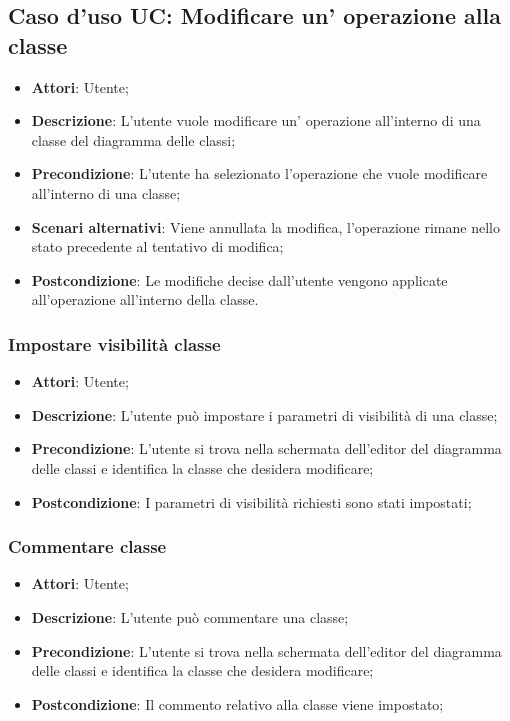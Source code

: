 \documentclass[../AnalisiDeiRequisiti.tex]{subfiles}
\begin{document}
	\subsection{Caso d'uso UC: Modificare un' operazione alla classe}
	\begin{itemize}
		\item \textbf{Attori}: Utente;
		
		\item \textbf{Descrizione}: L'utente vuole modificare un' operazione all'interno di una classe del diagramma delle classi;
		
		\item \textbf{Precondizione}: L'utente ha selezionato l'operazione che vuole modificare all'interno di una classe;
		
		\item \textbf{Scenari alternativi}: Viene annullata la modifica, l'operazione 
		rimane nello stato precedente al tentativo di modifica;
		
		\item \textbf{Postcondizione}: Le modifiche decise dall'utente vengono applicate all'operazione all'interno della classe.
	\end{itemize}
	
	
	\subsubsection{Impostare visibilità classe}
	\begin{itemize}
		\item \textbf{Attori}: Utente;
		\item \textbf{Descrizione}: L'utente può impostare i parametri di visibilità di una classe;
		\item \textbf{Precondizione}: L’utente si trova nella schermata dell’editor del diagramma delle classi e identifica la classe che desidera modificare;
		\item \textbf{Postcondizione}: I parametri di visibilità richiesti sono stati impostati;
	\end{itemize}
	
	\subsubsection{Commentare classe}
	\begin{itemize}
		\item \textbf{Attori}: Utente;
		\item \textbf{Descrizione}: L'utente può commentare una classe;
		\item \textbf{Precondizione}: L’utente si trova nella schermata dell’editor del diagramma delle classi e identifica la classe che desidera modificare;
		\item \textbf{Postcondizione}: Il commento relativo alla classe viene impostato;
	\end{itemize}
	
\end{document}
